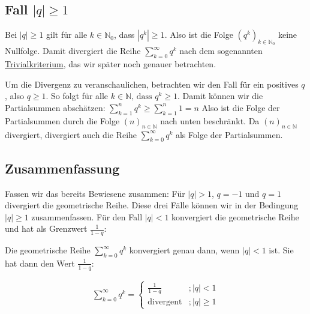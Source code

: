 \documentclass[fontsize=9pt,
               parskip=half-,
               DIV=14,
               listof=chapterentry,
               tocflat]{scrbook}
\begin{document}
\subsection{Fall $|q|\geq 1$}

Bei $|q|\geq 1$ gilt für alle $k\in \mathbb {N} _{0}$, dass $\left|q^{k}\right|\geq 1$. Also ist die Folge $\left(q^{k}\right)_{k\in \mathbb {N} _{0}}$ keine Nullfolge. Damit divergiert die Reihe $\sum _{k=0}^{\infty }q^{k}$ nach dem sogenannten \href{https://de.wikibooks.org/wiki/Mathe\_für\_Nicht-Freaks:\_Trivialkriterium,\_Nullfolgenkriterium,\_Divergenzkriterium}
{Trivialkriterium}, das wir später noch genauer betrachten.

Um die Divergenz zu veranschaulichen, betrachten wir den Fall für ein positives $q$, also $q\geq 1$. So folgt für alle $k\in \mathbb {N} {\text{, dass }}q^{k}\geq 1$. Damit können wir die Partialsummen abschätzen: $\sum _{k=1}^{n}q^{k}\geq \sum _{k=1}^{n}1=n$ Also ist die Folge der Partialsummen durch die Folge $(n)_{n\in \mathbb {N} }$ nach unten beschränkt. Da $(n)_{n\in \mathbb {N} }$ divergiert, divergiert auch die Reihe $\sum _{k=0}^{\infty }q^{k}$ als Folge der Partialsummen.

\subsection{Zusammenfassung}

Fassen wir das bereits Bewiesene zusammen: Für $|q|>1$, $q=-1$ und $q=1$ divergiert die geometrische Reihe. Diese drei Fälle können wir in der Bedingung $|q|\geq 1$ zusammenfassen. Für den Fall $|q|<1$ konvergiert die geometrische Reihe und hat als Grenzwert ${\tfrac {1}{1-q}}$:

\begin{theorem*}
Die geometrische Reihe $\sum _{k=0}^{\infty }q^{k}$ konvergiert genau dann, wenn $|q|<1$ ist. Sie hat dann den Wert ${\tfrac {1}{1-q}}$:

\begin{align*}
\sum _{k=0}^{\infty }q^{k}={\begin{cases}{\frac {1}{1-q}}&;|q|<1\\{\text{divergent}}&;|q|\geq 1\end{cases}}
\end{align*}

\end{theorem*}
\end{document}
